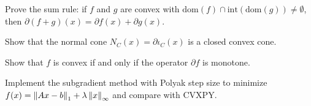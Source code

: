 \begin{exercise}[$\star\star$]
Prove the sum rule: if $f$ and $g$ are convex with
$\mathrm{dom}(f) \cap \mathrm{int}(\mathrm{dom}(g)) \neq \emptyset$, then
$\partial(f+g)(x) = \partial f(x) + \partial g(x)$.
\end{exercise}

\begin{exercise}[$\star\star$]
Show that the normal cone $N_C(x) = \partial \iota_C(x)$ is a closed convex cone.
\end{exercise}

\begin{exercise}[$\star\star\star$]
Show that $f$ is convex if and only if the operator $\partial f$ is monotone.
\end{exercise}

\begin{exercise}[$\star\star\star$]
Implement the subgradient method with Polyak step size to minimize
$f(x) = \left\| Ax - b \right\|_1 + \lambda\left\| x \right\|_\infty$ and compare with CVXPY.
\end{exercise}
